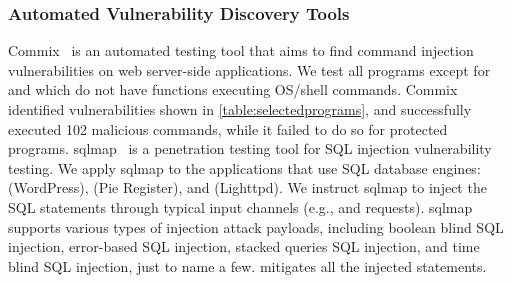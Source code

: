 \subsubsection{Automated Vulnerability Discovery Tools}
\label{appendix:vulnerability_discovery_tools}
Commix~\cite{commix} is an automated testing tool that aims to find command injection vulnerabilities on web server-side applications.
We test all programs except for  and  which do not have functions executing OS/shell commands. 
%
Commix identified vulnerabilities shown in \autoref{table:selectedprograms}, and successfully executed 102 malicious commands, while it failed to do so for \sysname protected programs. %
sqlmap~\cite{sqlmap} is a penetration testing tool for SQL injection vulnerability testing. We apply sqlmap to the applications that use SQL database engines:  (WordPress),  (Pie Register), and  (Lighttpd).
We instruct sqlmap to inject the SQL statements through typical input channels (e.g.,  and  requests).
sqlmap supports various types of injection attack payloads, including boolean blind SQL injection, error-based SQL injection, stacked queries SQL injection, and time blind SQL injection, just to name a few.
\sysname mitigates all the injected statements. %

